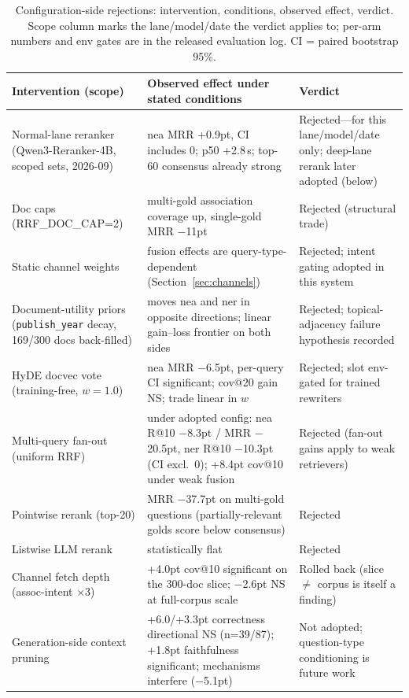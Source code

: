 \documentclass[sigconf,nonacm]{acmart}
\begin{document}
\begin{table}[!t]
\centering
\caption{Configuration-side rejections: intervention, conditions, observed
effect, verdict. Scope column marks the lane/model/date the verdict
applies to; per-arm numbers and env gates are in the released evaluation
log. CI = paired bootstrap 95\%.}
\label{tab:negresults}
\small
\begin{tabularx}{\textwidth}{p{}p{}X}
\toprule
Intervention (scope) & Observed effect under stated conditions & Verdict \\
\midrule
Normal-lane reranker (Qwen3-Reranker-4B, scoped sets, 2026-09) & nea MRR +0.9pt, CI includes 0; p50 +2.8\,s; top-60 consensus already strong & Rejected---for this lane/model/date only; deep-lane rerank later adopted (below) \\
Doc caps (RRF\_DOC\_CAP=2) & multi-gold association coverage up, single-gold MRR $-$11pt & Rejected (structural trade) \\
Static channel weights & fusion effects are query-type-dependent (Section~\ref{sec:channels}) & Rejected; intent gating adopted in this system \\
Document-utility priors (\texttt{publish\_year} decay, 169/300 docs back-filled) & moves nea and ner in opposite directions; linear gain--loss frontier on both sides & Rejected; topical-adjacency failure hypothesis recorded \\
HyDE docvec vote (training-free, $w{=}1.0$) & nea MRR $-$6.5pt, per-query CI significant; cov@20 gain NS; trade linear in $w$ & Rejected; slot env-gated for trained rewriters \\
Multi-query fan-out (uniform RRF) & under adopted config: nea R@10 $-$8.3pt / MRR $-$20.5pt, ner R@10 $-$10.3pt (CI excl.\ 0); +8.4pt cov@10 under weak fusion & Rejected (fan-out gains apply to weak retrievers) \\
Pointwise rerank (top-20) & MRR $-$37.7pt on multi-gold questions (partially-relevant golds score below consensus) & Rejected \\
Listwise LLM rerank & statistically flat & Rejected \\
Channel fetch depth (assoc-intent $\times$3) & +4.0pt cov@10 significant on the 300-doc slice; $-$2.6pt NS at full-corpus scale & Rolled back (slice $\neq$ corpus is itself a finding) \\
Generation-side context pruning & +6.0/+3.3pt correctness directional NS (n=39/87); +1.8pt faithfulness significant; mechanisms interfere ($-$5.1pt) & Not adopted; question-type conditioning is future work \\
\bottomrule
\end{tabularx}
\end{table}
\end{document}
